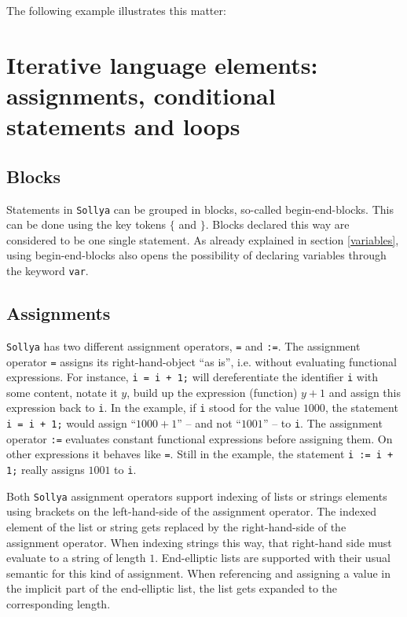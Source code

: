 \documentclass[a4paper]{article}
\newcommand{\key}[1]{\texttt{#1}}
\newcommand{\sollya}{\texttt{Sollya}\xspace}
\begin{document}
The following example illustrates this matter:



\section{Iterative language elements: assignments, conditional statements and loops}

\subsection{Blocks}

Statements in \sollya can be grouped in blocks, so-called
begin-end-blocks.  This can be done using the key tokens \key{$\lbrace$} and
\key{$\rbrace$}. Blocks declared this way are considered to be one single
statement. As already explained in section \ref{variables}, using
begin-end-blocks also opens the possibility of declaring variables
through the keyword \key{var}. 

\subsection{Assignments}

\sollya has two different assignment operators, \texttt{=} and
\texttt{:=}. The assignment operator \texttt{=} assigns its
right-hand-object ``as is'', i.e. without evaluating functional
expressions. For instance, \texttt{i = i + 1;} will dereferentiate the
identifier \texttt{i} with some content, notate it $y$, build up the
expression (function) $y + 1$ and assign this expression back to
\texttt{i}. In the example, if \texttt{i} stood for the value $1000$,
the statement \texttt{i = i + 1;} would assign ``$1000 + 1$'' -- and not
``$1001$'' -- to \texttt{i}. The assignment operator \texttt{:=} evaluates
constant functional expressions before assigning them. On other
expressions it behaves like \texttt{=}. Still in the example, the
statement \texttt{i := i + 1;} really assigns $1001$ to \texttt{i}.

Both \sollya assignment operators support indexing of lists or strings
elements using brackets on the left-hand-side of the assignment
operator. The indexed element of the list or string gets replaced by
the right-hand-side of the assignment operator.  When indexing strings
this way, that right-hand side must evaluate to a string of length
$1$. End-elliptic lists are supported with their usual semantic for
this kind of assignment.  When referencing and assigning a value in
the implicit part of the end-elliptic list, the list gets expanded to
the corresponding length.
\end{document}
